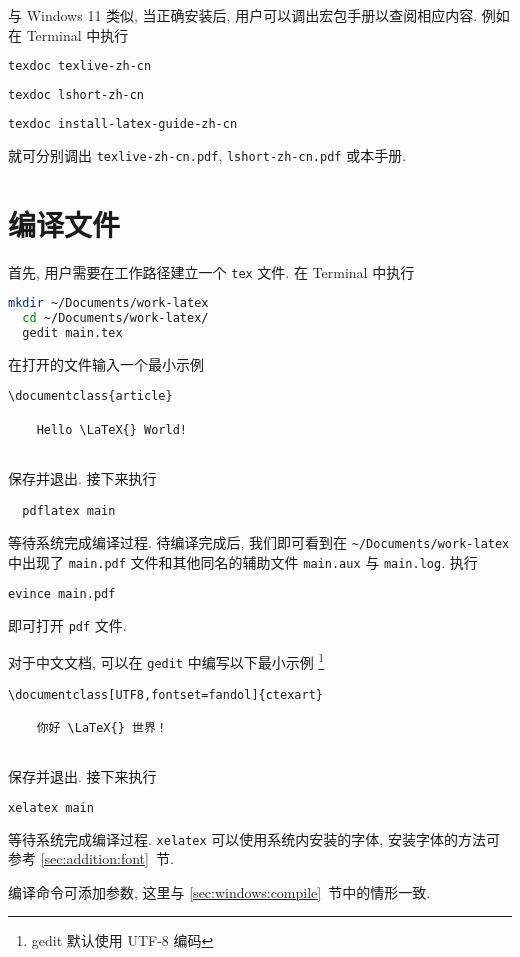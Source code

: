 与 Windows 11 类似,
当正确安装后,
用户可以调出宏包手册以查阅相应内容.
例如在 \textsf{Terminal} 中执行
\begin{lstlisting}[language=bash]
  texdoc texlive-zh-cn
\end{lstlisting}
\begin{lstlisting}[language=bash]
  texdoc lshort-zh-cn
\end{lstlisting}
\begin{lstlisting}[language=bash]
  texdoc install-latex-guide-zh-cn
\end{lstlisting}
就可分别调出 \texttt{texlive-zh-cn.pdf},
\texttt{lshort-zh-cn.pdf}
或本手册.

\section{编译文件}

首先, 用户需要在工作路径建立一个 \texttt{tex} 文件.
在 \textsf{Terminal} 中执行
\begin{lstlisting}[language = bash]
  mkdir ~/Documents/work-latex
  cd ~/Documents/work-latex/
  gedit main.tex
\end{lstlisting}
在打开的文件输入一个最小示例
\begin{lstlisting}[language = {[LaTeX]TeX}]
  \documentclass{article}
  
    Hello \LaTeX{} World!
  
\end{lstlisting}
保存并退出. 
接下来执行
\begin{lstlisting}
  pdflatex main
\end{lstlisting}
等待系统完成编译过程. 
待编译完成后,
我们即可看到在 \texttt{\~{}/Documents/work-latex} 中出现了
\texttt{main.pdf} 文件和其他同名的辅助文件 \texttt{main.aux} 与
\texttt{main.log}. 
执行
\begin{lstlisting}[language=bash]
  evince main.pdf
\end{lstlisting}
即可打开 \texttt{pdf} 文件.

对于中文文档, 可以在 \texttt{gedit} 中编写以下最小示例%
\footnote{gedit 默认使用 UTF-8 编码}%
\begin{lstlisting}[language={[LaTeX]TeX}]
  \documentclass[UTF8,fontset=fandol]{ctexart}
  
    你好 \LaTeX{} 世界！
  
\end{lstlisting}
保存并退出.
接下来执行
\begin{lstlisting}[language=bash]
  xelatex main
\end{lstlisting}
等待系统完成编译过程.
\texttt{xelatex} 可以使用系统内安装的字体,
安装字体的方法可参考 \ref{sec:addition:font}~节.

编译命令可添加参数, 这里与 \ref{sec:windows:compile}~节中的情形一致.
